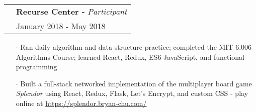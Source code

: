 \documentclass[a4paper, oneside, final]{scrartcl} %
\newcommand{\gray}{\rowcolor[gray]{.90}} %
\begin{document}
\begin{center}

  \vspace{-0.05cm}

  \begin{tabularx}{1.00\linewidth}{>{\raggedleft\scshape}p{0cm}X}
    \gray& \textbf{Recurse Center -} \textit{Participant}\\
    \gray& {January 2018 - May 2018}\\
  \end{tabularx}
  \vspace{-0.2cm}
  \begin{itemize} \itemsep-0.2cm
      \vspace{-0.1cm}

    \item[$\cdot$] Ran daily algorithm and data structure practice; completed the MIT 6.006 Algorithms Course; learned React, Redux, ES6 JavaScript, and functional programming
    \item[$\cdot$] Built a full-stack networked implementation of the multiplayer board game \textit{Splendor} using React, Redux, Flask, Let's Encrypt, and custom CSS - play online at \href{https://splendor.bryan-chu.com/}{https://splendor.bryan-chu.com/}\\
  \end{itemize}


\end{center}
\end{document}
